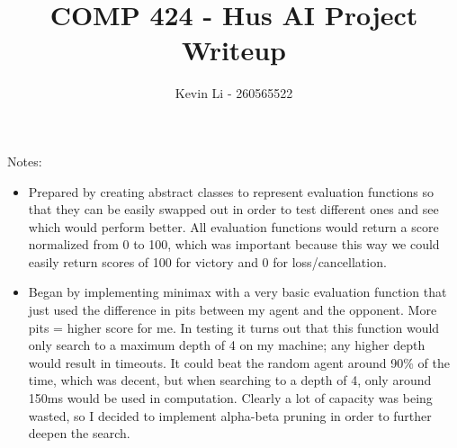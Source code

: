 \documentclass{article}
\title{COMP 424 - Hus AI Project Writeup}
\author{Kevin Li - 260565522}
\begin{document}
\maketitle
\newpage

Notes:

\begin{itemize}
    \item Prepared by creating abstract classes to represent evaluation functions so that they can be easily swapped out
    in order to test different ones and see which would perform better. All evaluation functions would return a score normalized
    from 0 to 100, which was important because this way we could easily return scores of 100 for victory and 0 for loss/cancellation.

    \item Began by implementing minimax with a very basic evaluation function that just used the difference in pits between my agent and
    the opponent. More pits = higher score for me. In testing it turns out that this function would only search to a maximum depth of 4 on 
    my machine; any higher depth would result in timeouts. It could beat the random agent around 90\% of the time, which was decent, but
    when searching to a depth of 4, only around 150ms would be used in computation. Clearly a lot of capacity was being wasted, so I decided
    to implement alpha-beta pruning in order to further deepen the search.
\end{itemize}
\end{document}
